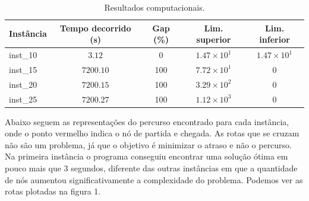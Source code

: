 \documentclass[12pt]{article}
\begin{document}

\begin{table}[h!]
  \begin{center}
    \caption{Resultados computacionais.}
    \label{tab:table1}
    \begin{tabular}{l|c|c|c|c} %
      \textbf{Instância} & \textbf{Tempo decorrido (\si{\second})} & \textbf{Gap (\%)} & \textbf{Lim. superior} & \textbf{Lim. inferior} \\
      \hline
      inst\_10           & $3.12 $                                 & 0                 & $1.47 \times 10^1$     & $1.47 \times 10^1$     \\
      \hline
      inst\_15           & $7200.10 $                              & 100               & $7.72 \times 10^1$     & $0$                    \\
      \hline
      inst\_20           & $7200.15 $                              & 100               & $3.29 \times 10^2$     & $0$                    \\
      \hline
      inst\_25           & $7200.27 $                              & 100               & $1.12 \times 10^3$     & $0$                    \\
      \hline
    \end{tabular}
  \end{center}
\end{table}



Abaixo seguem as representações do percurso encontrado para cada instância, onde o ponto vermelho indica o nó de partida e chegada. As rotas que se cruzam não são um problema, já que o objetivo é minimizar o atraso e não o percurso.
\linebreak
Na primeira instância o programa conseguiu encontrar uma solução ótima em pouco mais que 3 segundos, diferente das outras instâncias em que a quantidade de nós aumentou significativamente a complexidade do problema. Podemos ver as rotas plotadas na figura 1.
\end{document}
